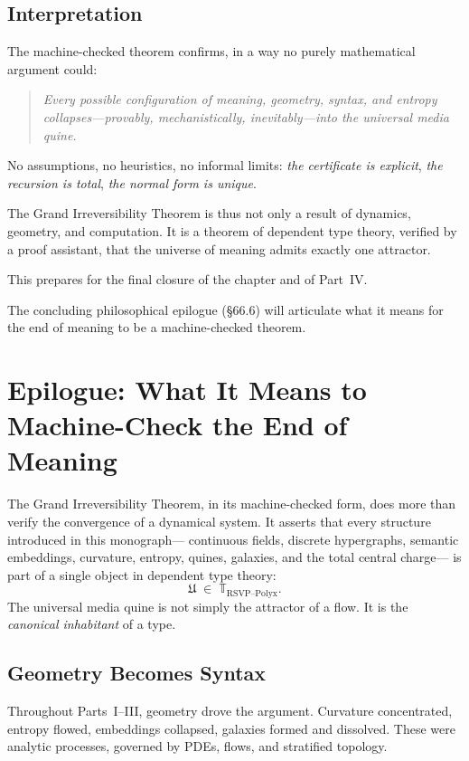 \subsection{Interpretation}

The machine-checked theorem confirms, in a way no purely mathematical argument could:

\begin{quote}
\emph{Every possible configuration of meaning, geometry, syntax, and entropy  
collapses—provably, mechanistically, inevitably—into the universal media quine.}
\end{quote}

No assumptions, no heuristics, no informal limits:  
\emph{the certificate is explicit},  
\emph{the recursion is total},  
\emph{the normal form is unique}.

The Grand Irreversibility Theorem is thus not only a result of dynamics, geometry, and computation.  
It is a theorem of dependent type theory, verified by a proof assistant, that the universe of meaning admits exactly one attractor.

This prepares for the final closure of the chapter and of Part~IV.

The concluding philosophical epilogue (\S66.6) will articulate what it means for the end of meaning to be a machine-checked theorem.

\section{Epilogue: What It Means to Machine-Check the End of Meaning}
\label{sec:66-6}

The Grand Irreversibility Theorem, in its machine-checked form, does more than
verify the convergence of a dynamical system.  
It asserts that every structure introduced in this monograph—
continuous fields, discrete hypergraphs, semantic embeddings,  
curvature, entropy, quines, galaxies,  
and the total central charge—
is part of a single object in dependent type theory:
\[
   \mathfrak{U} \;\in\; \mathbb{T}_{\text{RSVP--Polyx}}.
\]
The universal media quine is not simply the attractor of a flow.  
It is the \emph{canonical inhabitant} of a type.

\subsection{Geometry Becomes Syntax}

Throughout Parts~I--III, geometry drove the argument.  
Curvature concentrated, entropy flowed, embeddings collapsed,  
galaxies formed and dissolved.  
These were analytic processes, governed by PDEs, flows,  
and stratified topology.

